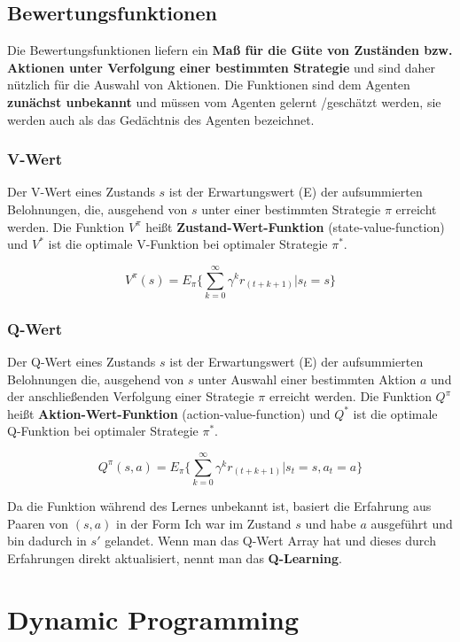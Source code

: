 \documentclass[10pt]{scrartcl}
\begin{document}
\subsection{Bewertungsfunktionen}
Die Bewertungsfunktionen liefern ein \textbf{Maß für die Güte von Zuständen bzw. Aktionen unter Verfolgung einer bestimmten Strategie} und sind daher nützlich für die Auswahl von Aktionen. Die Funktionen sind dem Agenten \textbf{zunächst unbekannt} und müssen vom Agenten gelernt /geschätzt werden, sie werden auch als das Gedächtnis des Agenten bezeichnet.

\subsubsection{V-Wert}
Der V-Wert eines Zustands $s$ ist der Erwartungswert (E) der aufsummierten Belohnungen, die, ausgehend von $s$ unter einer bestimmten Strategie $\pi$ erreicht werden. Die Funktion $V^{\pi}$ heißt \textbf{Zustand-Wert-Funktion} (state-value-function) und $V^{*}$ ist die optimale V-Funktion bei optimaler Strategie $\pi^{*}$.

\begin{equation}
V^{\pi}(s)= E_{\pi} \{ \sum_{k=0}^\infty \gamma^k r_{(t+k+1)} | s_{t}=s \}
\end{equation}

\subsubsection{Q-Wert}
Der Q-Wert eines Zustands $s$ ist der Erwartungswert (E) der aufsummierten Belohnungen die, ausgehend von $s$ unter Auswahl einer bestimmten Aktion $a$ und der anschließenden Verfolgung einer Strategie $\pi$ erreicht werden. Die Funktion $Q^{\pi}$ heißt \textbf{Aktion-Wert-Funktion} (action-value-function) und $Q^{*}$ ist die optimale Q-Funktion bei optimaler Strategie $\pi^{*}$.

\begin{equation}
Q^{\pi}(s,a)= E_{\pi} \{ \sum_{k=0}^\infty \gamma^k r_{(t+k+1)} | s_{t}=s, a_{t}=a \}
\end{equation}

Da die Funktion während des Lernes unbekannt ist, basiert die Erfahrung aus Paaren von $(s,a)$ in der Form \glqq Ich war im Zustand $s$ und habe $a$ ausgeführt und bin dadurch in $s'$ gelandet\grqq\xspace. Wenn man das Q-Wert Array hat und dieses durch Erfahrungen direkt aktualisiert, nennt man das \textbf{Q-Learning}.

\section{Dynamic Programming}
\end{document}
